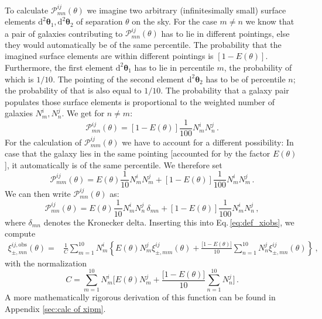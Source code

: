 \documentclass[referee]{aa} %
\renewcommand{\[}{\begin{equation}}
\renewcommand{\]}{\end{equation}}
\renewcommand{\rm}{\mathrm}
\def\b#1{\bm{#1}}
\def\d{\rm{d}}
\begin{document}
To calculate $\mathcal{P}_{mn}^{ij}(\theta)$ we imagine two arbitrary (infinitesimally small) surface elements $\d^2\b\theta_1,\d^2\b\theta_2$ of separation $\theta$ on the sky. For the case $m\neq n$ we know that a pair of galaxies contributing to $\mathcal{P}_{mn}^{ij}(\theta)$ has to lie in different pointings, else they would automatically be of the same percentile. The probability that the imagined surface elements are within different pointings is $[1-E(\theta)]$. Furthermore, the first element $\d^2\b\theta_1$ has to lie in percentile $m$, the probability of which is $1/10$. The pointing of the second element $\d^2\b\theta_2$ has to be of percentile $n$; the probability of that is also equal to $1/10$. The probability that a galaxy pair populates those surface elements is proportional to the weighted number of galaxies $N_m^i,N_n^j$. We get for $n\neq m$: \[
\mathcal{P}_{mn}^{ij}(\theta) = [1-E(\theta)]\frac{1}{100} N_m^i N_n^j\, .
\label{eq:pmnij_corr1}
\]
For the calculation of $\mathcal{P}_{mm}^{ij}(\theta)$ we have to account for a different possibility: In case that the galaxy lies in the same pointing [accounted for by the factor $E(\theta)$], it automatically is of the same percentile. We therefore set \[
\mathcal{P}_{mm}^{ij}(\theta) = E(\theta)\frac{1}{10} N_m^iN_m^j + [1-E(\theta)]\frac{1}{100} N_m^i N_m^j \, .
\label{eq:pmnij_corr2}
\]
We can then write $\mathcal{P}_{mn}^{ij}(\theta)$ as: \[
\mathcal{P}_{mn}^{ij}(\theta) = E(\theta)\frac{1}{10} N_m^iN_n^j\,\delta_{mn} + [1-E(\theta)]\frac{1}{100} N_m^i N_n^j \, ,
\label{eq:pmnij_uncorr}
\]
where $\delta_{mn}$ denotes the Kronecker delta.
Inserting this into Eq.\,\eqref{eq:def_xiobs}, we compute
\begin{align}
\xi_{\pm,mn}^{ij,\rm{obs}}(\theta) = & \frac{1}{C}\sum_{m=1}^{10} N_m^i \left\{ E(\theta) N_m^j \xi_{\pm,mm}^{ij}(\theta) + \frac{\big[1-E(\theta)\big]}{10}\sum_{n=1}^{10}N_n^j \xi_{\pm,mn}^{ij}(\theta)\right\}\, ,
\label{eq:correctionfunction1}
\end{align}
with the normalization
\[
C = \sum_{m=1}^{10} N_m^i \bigg[ E(\theta)  N_m^j + \frac{\big[1-E(\theta)\big]}{10}\sum_{n=1}^{10} N_n^j\bigg]\, .
\]
A more mathematically rigorous derivation of this function can be found in Appendix \ref{sec:calc of xipm}.
\end{document}
